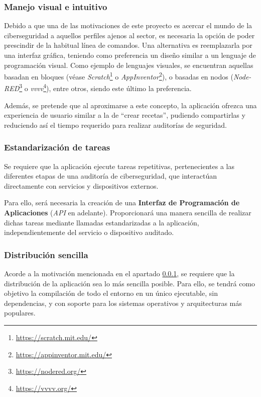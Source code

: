 \subsubsection{Manejo visual e intuitivo} \label{subsub:objvisual}

Debido a que una de las motivaciones de este proyecto es acercar el mundo de la ciberseguridad a aquellos perfiles ajenos al sector, es necesaria la opción de poder prescindir de la habitual línea de comandos. Una alternativa es reemplazarla por una interfaz gráfica, teniendo como preferencia un diseño similar a un lenguaje de programación visual. Como ejemplo de lenguajes visuales, se encuentran aquellas basadan en bloques (véase \textit{Scratch}\footnote{\url{https://scratch.mit.edu/}} o \textit{AppInventor}\footnote{\url{https://appinventor.mit.edu/}}), o basadas en nodos (\textit{Node-RED}\footnote{\url{https://nodered.org/}} o \textit{vvvv}\footnote{\url{https://vvvv.org/}}), entre otros, siendo este último la preferencia.\sn

Además, se pretende que al aproximarse a este concepto, la aplicación ofrezca una experiencia de usuario similar a la de ``crear recetas'', pudiendo compartirlas y reduciendo así el tiempo requerido para realizar auditorías de seguridad.\sn

\subsubsection{Estandarización de tareas} \label{subsub:objapi}

Se requiere que la aplicación ejecute tareas repetitivas, pertenecientes a las diferentes etapas de una auditoría de ciberseguridad, que interactúan directamente con servicios y dispositivos externos.\sn

Para ello, será necesaria la creación de una \textbf{Interfaz de Programación de Aplicaciones} (\textit{API} en adelante). Proporcionará una manera sencilla de realizar dichas tareas mediante llamadas estandarizadas a la aplicación, independientemente del servicio o dispositivo auditado.\sn

\subsubsection{Distribución sencilla} \label{subsub:objdist}

Acorde a la motivación mencionada en el apartado \ref{subsub:objvisual}, se requiere que la distribución de la aplicación sea lo más sencilla posible. Para ello, se tendrá como objetivo la compilación de todo el entorno en un único ejecutable, sin dependencias, y con soporte para los sistemas operativos y arquitecturas más populares.\sn

